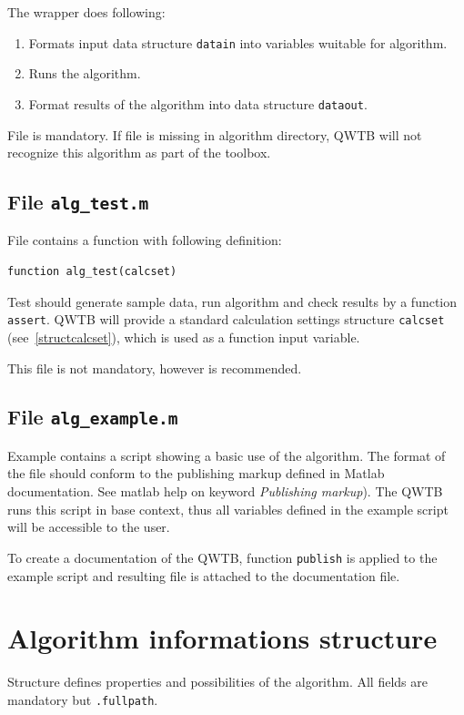 \documentclass[12pt,a4paper,oneside]{report} %
\begin{document}
The wrapper does following:
\begin{enumerate}
        \item Formats input data structure \lstinline{datain} into variables wuitable for algorithm.
        \item Runs the algorithm.
        \item Format results of the algorithm into data structure \lstinline{dataout}.
\end{enumerate}

File is mandatory. If file is missing in algorithm directory, QWTB will not recognize this
algorithm as part of the toolbox.

\subsection{File {\tt alg\_test.m}} %
\label{filealgtest}
File contains a function with following definition:

\begin{lstlisting}
function alg_test(calcset)
\end{lstlisting}

Test should generate sample data, run algorithm and check results by a function \lstinline{assert}.
QWTB will provide a standard calculation settings structure \lstinline{calcset}
(see~\ref{structcalcset}), which is used as a function input variable.

This file is not mandatory, however is recommended.

\subsection{File {\tt alg\_example.m}} %
\label{filealgexample}

Example contains a script showing a basic use of the algorithm. The format of the file should
conform to the publishing markup defined in Matlab documentation. See matlab help on keyword
\emph{Publishing markup}). The QWTB runs this script in base context, thus all variables defined in
the example script will be accessible to the user.

To create a documentation of the QWTB, function \lstinline{publish} is applied to the example script
and resulting file is attached to the documentation file.

\section{Algorithm informations structure} %
\label{structalginfo}
Structure defines properties and possibilities of the algorithm. All fields are mandatory but
\lstinline{.fullpath}.
\end{document}
